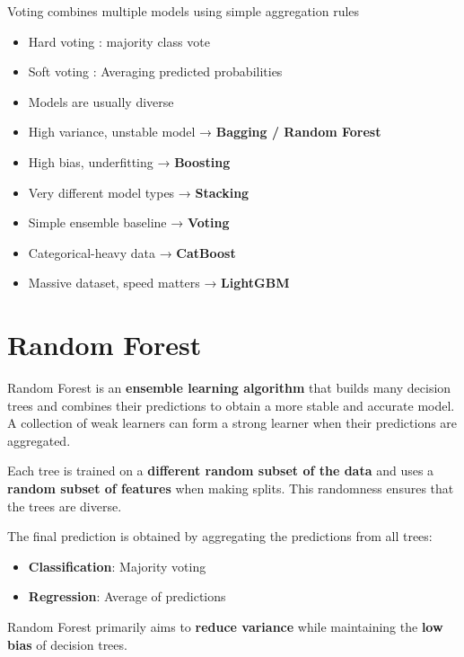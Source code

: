 \documentclass[10pt,a4paper]{article}
\begin{document}
		Voting combines multiple models using simple aggregation rules
	
		\begin{itemize}
			\item Hard voting : majority class vote
			\item Soft voting : Averaging predicted probabilities
			\item Models are usually diverse
		\end{itemize}
	
	
		\begin{itemize}
			\item High variance, unstable model → \textbf{Bagging / Random Forest}
			\item High bias, underfitting → \textbf{Boosting}
			\item Very different model types → \textbf{Stacking}
			\item Simple ensemble baseline → \textbf{Voting}
			\item Categorical-heavy data → \textbf{CatBoost}
			\item Massive dataset, speed matters → \textbf{LightGBM}
		\end{itemize}
	
	

		\section{Random Forest}
	
		Random Forest is an \textbf{ensemble learning algorithm} that builds many decision trees and combines their predictions to obtain a more stable and accurate model. A collection of weak learners can form a strong learner when their predictions are aggregated.
	
	
		Each tree is trained on a \textbf{different random subset of the data} and uses a \textbf{random subset of features} when making splits. This randomness ensures that the trees are diverse.
	
		The final prediction is obtained by aggregating the predictions from all trees:
	
		\begin{itemize}
			\item \textbf{Classification}: Majority voting
			\item \textbf{Regression}: Average of predictions
		\end{itemize}
	
		Random Forest primarily aims to \textbf{reduce variance} while maintaining the \textbf{low bias} of decision trees.
	
\end{document}
